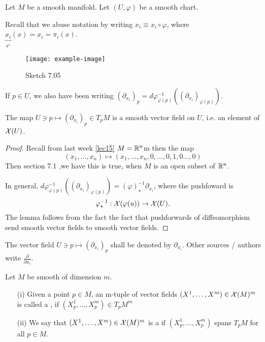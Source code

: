 Let \(M\) be a smooth manifold. Let \((U,\varphi)\) be a smooth chart. 

Recall that we abuse notation by writing \(x_i\equiv x_i\circ \varphi\), where \(\underbrace{x_i}_{x^i}(x)=x_i=\pi_i(x)\).
\begin{figure}[H]\label{fig:7.05}
    \centering
    \texttt{[image: example-image]}
    \caption{Sketch 7.05}
\end{figure}

If \(p\in U\), we also have been writing \((\partial_{x_i})_p=d\varphi_{\varphi(p)}^{-1}((\partial_{x_i})_{\varphi(p)})\).

\begin{lemma}\label{lem:7.7}
    The map \(U\ni p\mapsto (\partial_{x_i})_p\in T_p M\) is a smooth vector field on \(U\), i.e. an element 
    of \(\mathcal{X}(U)\).
\end{lemma}

\begin{proof}
    Recall from last week \ref{lec15} %
    \(M=\mathbb{R}^n\)m then the map \[(x_1,\dots,x_n)\mapsto (x_1,\dots,x_n,0,\dots,0,1,0\dots,0)\]
    Then section 7.1 %
    ,we have this is true, when \(M\) is an open subset of \(\mathbb{R}^n\).

    In general, \(d\varphi_{\varphi(p)}^{-1}((\partial_{x_i})_{\varphi(p)})=(\varphi)^{-1}_\star \partial_{x_i}\), where the pushfoward is 
    \[\varphi_\star^{-1}:\mathcal{X}(\varphi(u))\to\mathcal{X}(U).\]
    The lemma follows from the fact the fact that pushforwards of diffeomorphism send smooth vector fields to 
    smooth vector fields.
\end{proof}

 The vector field \(U\ni p\mapsto (\partial_{x_i})_p\) shall be denoted by \(\partial_{x_i}\).
Other sources / authors write \(\frac{\partial}{\partial x_i}\).

\begin{definition*}
    Let \(M\) be smooth of dimension \(m\).
    \begin{enumerate}
        \item[(i)] Given a point \(p\in M\), an m-tuple of vector fields \((X^1,\dots,X^m)\in \mathcal{X}(M)^m\) is called a , if \((X_p^1,\dots,X_p^m)\in T_p M^m\)
        \item[(ii)] We say that \((X^1,\dots,X^m)\in \mathcal{X}(M)^m\) is a  if \((X_p^1,\dots,X_p^m)\) spans \(T_pM\) for all \(p\in M\). 
    \end{enumerate}
\end{definition*}

